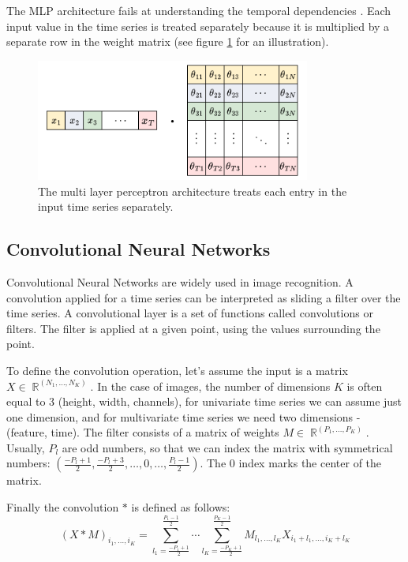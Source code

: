 \documentclass[a4paper,11pt,twoside]{report}
\theoremstyle{definition}
\DeclareMathOperator{\real}{\mathbb{R}}
\begin{document}
The MLP architecture fails at understanding the temporal dependencies \cite{dl_tsc}. Each input value in the time series is treated separately because it is multiplied by a separate row in the weight matrix (see figure \ref{fig:mlp_multiplication} for an illustration).
\begin{figure}
\centering
\label{fig:mlp_multiplication}
\includegraphics[height=4cm]{imgs/MLP_multiplication_v2.png}
\caption{The multi layer perceptron architecture treats each entry in the input time series separately.}
\end{figure}
\subsection{Convolutional Neural Networks}
Convolutional Neural Networks are widely used in image recognition. A convolution applied for a time series can be interpreted as sliding a filter over the time series. A convolutional layer is a set of functions called convolutions or filters. The filter is applied at a given point, using the values surrounding the point.

To define the convolution operation, let's assume the input is a matrix $X \in \real^{(N_1, \dots, N_K)}$. In the case of images, the number of dimensions $K$ is often equal to $3$ (height, width, channels), for univariate time series we can assume just one dimension, and for multivariate time series we need two dimensions - (feature, time).
The filter consists of a matrix of weights $M \in \real^{(P_1, \dots, P_K)}$.
Usually, $P_l$ are odd numbers, so that we can index the matrix with symmetrical numbers: $ (\frac{-P_l+1}{2},  \frac{-P_l+3}{2}, \dots, 0, \dots, \frac{P_l-1}{2})$. The $0$ index marks the center of the matrix.

Finally the convolution $*$ is defined as follows:
$$(X*M)_{i_1, \dots, i_K} = \sum_{l_1=\frac{-P_1+1}{2}}^{\frac{P_1-1}{2}} \cdots \sum_{l_K=\frac{-P_K+1}{2}}^{\frac{P_K-1}{2}} M_{l_1, \dots, l_K} X_{i_1 + l_1, \dots, i_K + l_K}$$
\end{document}
